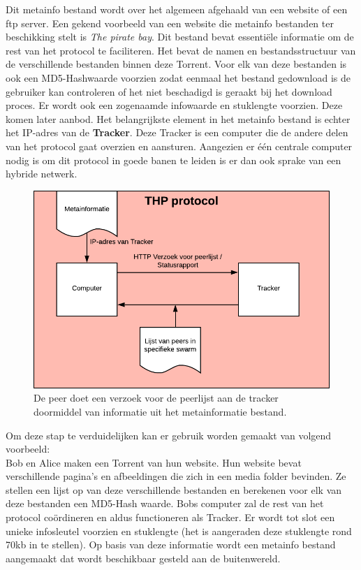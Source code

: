 Dit metainfo bestand wordt over het algemeen afgehaald van een website of een ftp server. Een gekend voorbeeld van een website die metainfo bestanden ter beschikking stelt is \textit{The pirate bay}. Dit bestand bevat essentiële informatie om de rest van het protocol te faciliteren. Het bevat de namen en bestandsstructuur van de verschillende bestanden binnen deze Torrent. Voor elk van deze bestanden is ook een MD5-Hashwaarde voorzien zodat eenmaal het bestand gedownload is de gebruiker kan controleren of het niet beschadigd is geraakt bij het download proces. Er wordt ook een zogenaamde infowaarde en stuklengte voorzien. Deze komen later aanbod. Het belangrijkste element in het metainfo bestand is echter het IP-adres van de \textbf{Tracker}. Deze Tracker is een computer die de andere delen van het protocol gaat overzien en aansturen. Aangezien er één centrale computer nodig is om dit protocol in goede banen te leiden is er dan ook sprake van een hybride netwerk.\\

\begin{figure}[h!]
	\centering
		\includegraphics[scale=.4]{torrent-2.png}
			\caption[THP stap - Torrenting 2]{De peer doet een verzoek voor de peerlijst aan de tracker doormiddel van informatie uit het metainformatie bestand.}
\end{figure}
\newpage
Om deze stap te verduidelijken kan er gebruik worden gemaakt van volgend voorbeeld:\\

Bob en Alice maken een Torrent van hun website. Hun website bevat verschillende pagina's en afbeeldingen die zich in een media folder bevinden. Ze stellen een lijst op van deze verschillende bestanden en berekenen voor elk van deze bestanden een MD5-Hash waarde. Bobs computer zal de rest van het protocol coördineren en aldus functioneren als Tracker. Er wordt tot slot een unieke infosleutel voorzien en stuklengte (het is aangeraden deze stuklengte rond 70kb in te stellen). Op basis van deze informatie wordt een metainfo bestand aangemaakt dat wordt beschikbaar gesteld aan de buitenwereld.\\


